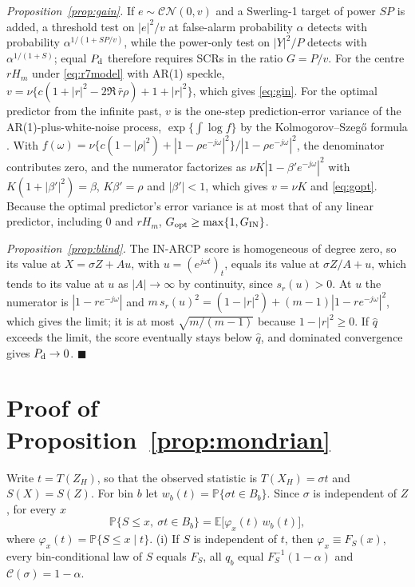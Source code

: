 \documentclass[journal]{IEEEtran}
\newcommand{\PP}{\mathbb{P}}
\begin{document}
\emph{Proposition~\ref{prop:gain}.} If $e\sim\mathcal{CN}(0,v)$ and a Swerling-1 target of power $SP$ is added, a threshold test on $|e|^2/v$ at false-alarm probability $\alpha$ detects with probability $\alpha^{1/(1+SP/v)}$, while the power-only test on $|Y|^2/P$ detects with $\alpha^{1/(1+S)}$; equal $P_{\rm d}$ therefore requires SCRs in the ratio $G=P/v$. For the centre $rH_m$ under \eqref{eq:r7model} with AR(1) speckle, $v=\nu\{c(1+|r|^2-2\Re\,\bar r\rho)+1+|r|^2\}$, which gives \eqref{eq:gin}. For the optimal predictor from the infinite past, $v$ is the one-step prediction-error variance of the AR(1)-plus-white-noise process, $\exp\{\int\log f\}$ by the Kolmogorov--Szeg\H{o} formula \cite{brockwell1991}. With $f(\omega)=\nu\{c(1-|\rho|^2)+|1-\rho e^{-j\omega}|^2\}/|1-\rho e^{-j\omega}|^2$, the denominator contributes zero, and the numerator factorizes as $\nu K|1-\beta' e^{-j\omega}|^2$ with $K(1+|\beta'|^2)=\beta$, $K\beta'=\rho$ and $|\beta'|<1$, which gives $v=\nu K$ and \eqref{eq:gopt}. Because the optimal predictor's error variance is at most that of any linear predictor, including $0$ and $rH_m$, $G_{\rm opt}\ge\max\{1,G_{\rm IN}\}$.

\emph{Proposition~\ref{prop:blind}.} The IN-ARCP score is homogeneous of degree zero, so its value at $X=\sigma Z+Au$, with $u=(e^{j\omega t})_t$, equals its value at $\sigma Z/A+u$, which tends to its value at $u$ as $|A|\to\infty$ by continuity, since $s_r(u)>0$. At $u$ the numerator is $|1-re^{-j\omega}|$ and $m\,s_r(u)^2=(1-|r|^2)+(m-1)|1-re^{-j\omega}|^2$, which gives the limit; it is at most $\sqrt{m/(m-1)}$ because $1-|r|^2\ge0$. If $\widehat q$ exceeds the limit, the score eventually stays below $\widehat q$, and dominated convergence gives $P_{\rm d}\to0$. \hfill$\blacksquare$

\section{Proof of Proposition~\ref{prop:mondrian}}\label{app:mondrian}
Write $t=T(Z_H)$, so that the observed statistic is $T(X_H)=\sigma t$ and $S(X)=S(Z)$. For bin $b$ let $w_b(t)=\PP\{\sigma t\in B_b\}$. Since $\sigma$ is independent of $Z$, for every $x$
\begin{equation}
\PP\{S\le x,\ \sigma t\in B_b\}=\mathbb E\big[\varphi_x(t)\,w_b(t)\big],
\label{eq:app1}
\end{equation}
where $\varphi_x(t)=\PP\{S\le x\mid t\}$.
(i) If $S$ is independent of $t$, then $\varphi_x\equiv F_S(x)$, every bin-conditional law of $S$ equals $F_S$, all $q_b$ equal $F_S^{-1}(1-\alpha)$ and $\mathcal C(\sigma)=1-\alpha$.
\end{document}
